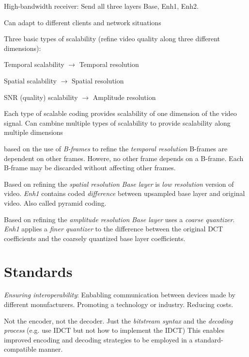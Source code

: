 \begin{compactdesc}
\begin{itemize*}[label=\colorbullet]
		\item High-bandwidth receiver: Send all three layers Base, Enh1, Enh2.
		\item Can adapt to different clients and network situations
		\item Three basic types of scalability (refine video quality along three different dimensions):\\
			\begin{enumerate*}[label=\quad\protect\circled{\alph*},itemjoin=]
				\item Temporal scalability $\to$ Temporal resolution\\
				\item Spatial scalability $\to$ Spatial resolution\\
				\item SNR (quality) scalability $\to$ Amplitude resolution\\
			\end{enumerate*}
		\item Each type of scalable coding provides scalability of one dimension of the video signal. Can cambine multiple types of scalability to provide scalability along multiple dimensions
	\end{itemize*}
\item[\lp{Temporal Scalability}] based on the use of \emph{B-frames} to refine the \emph{temporal resolution} B-frames are dependent on other frames. Howere, no other frame depends on a B-frame. Each B-frame may be discarded without affecting other frames. 
\item[\lp{Spatial scalability}] Based on refining the \emph{spatial resolution} \emph{Base layer} is \emph{low resolution} version of video. \emph{Enh1} contains coded \emph{difference} between upsampled base layer and original video. Also called pyramid coding.
\item[\lp{SNR scalability}] Based on refining the \emph{amplitude resolution} \emph{Base layer} uses a \emph{coarse quantizer}. \emph{Enh1} applies a \emph{finer quantizer} to the difference between the original DCT coefficients and the coarsely quantized base layer coefficients.
\section{Standards}
	\item[\lp{Goal}] \emph{Ensuring interoperability}: Enbabling communication between devices made by different monufacturers. Promoting a technology or industry. Reducing costs.
	\item[\lp{Scope of standardization}] Not the encoder, not the decoder. Just the \emph{bitstream syntax} and the \emph{decoding process} (e.g. use IDCT but not how to implement the IDCT) This enables improved encoding and decoding strategies to be employed in a standard-compatible manner.

\end{compactdesc}
